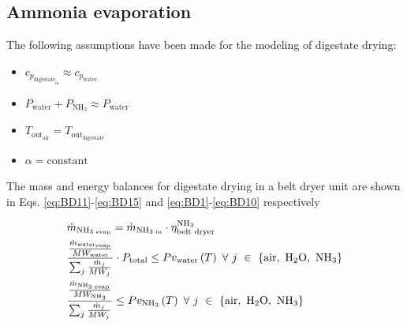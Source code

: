 \begin{refsection}[referencesApD]
\subsection{Ammonia evaporation}\label{section:DigDryingNRecoveryPaper}
The following assumptions have been made for the modeling of digestate drying:
\begin{itemize}
	\item $c_{p_{\text{digestate}_{\text{in}}}} \approx c_{p_{\text{water}}}$
	\item $P_{\text{water}} + P_{\text{NH}_3} \approx P_{\text{water}}$
	\item $T_{\text{out}_{\text{air}}} = T_{\text{out}_{\text{digestate}}}$
	\item $\alpha = \text{constant}$
\end{itemize}

The mass and energy balances for digestate drying in a belt dryer unit are shown in Eqs. \ref{eq:BD11}-\ref{eq:BD15} and \ref{eq:BD1}-\ref{eq:BD10} respectively

\begin{align}
&\dot{m}_{\text{NH}_{3\text{ evap}}} = \dot{m}_{\text{NH}_{3\text{ in}}} \cdot \eta_{\text{belt dryer}}^{\text{NH}_3} \label{eq:BD11} 
\\
& \frac{\frac{\dot{m}_{\text{water}_\text{evap}}}{MW_{\text{water}}}}{\sum_{j}\frac{\dot{m}_j}{MW_j}} \cdot P_{\text{total}} \leq Pv_{\text{water}} \left(T\right) \ \forall \ j \ \in \ \{\text{air}, \ \text{H\textsubscript{2}O}, \ \text{NH}_3\} \label{eq:BD13} 
\\
&\frac{\frac{\dot{m}_{\text{NH}_{3\text{ evap}}}}{MW_{\text{NH}_3}}}{\sum_{j}\frac{\dot{m}_j}{MW_j}} \leq Pv_{\text{NH}_3} \left(T\right) \ \forall \ j \ \in \ \{\text{air}, \ \text{H\textsubscript{2}O}, \ \text{NH}_3\}\label{eq:BD15} 
\end{align}


\end{refsection}
